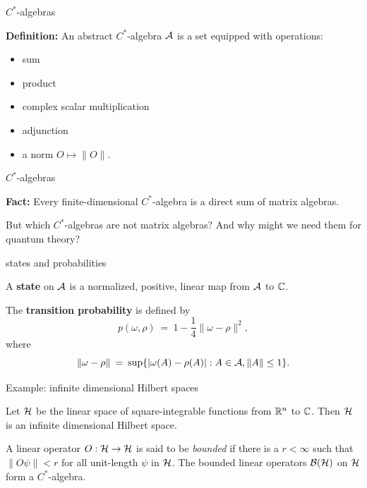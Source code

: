 \documentclass[8pt]{beamer}
\begin{document}
\begin{frame}{$C^*$-algebras}

  \textbf{Definition:} An abstract $C^*$-algebra $\mathcal A$ is a set
  equipped with operations:
\begin{itemize}
\item sum
\item product
\item complex scalar multiplication
\item adjunction
\item a norm $O\mapsto \| O\|$.
\end{itemize}


\end{frame}
\begin{frame}{$C^*$-algebras}

  \textbf{Fact:} Every finite-dimensional $C^*$-algebra is a direct
  sum of matrix algebras.

  But which $C^*$-algebras are not matrix algebras?  And why might we
  need them for quantum theory?

\end{frame}



\begin{frame}{states and probabilities}

  A \textbf{state} on $\mathcal A$ is a normalized, positive, linear map from
  $\mathcal A$ to $\mathbb C$.

\bigskip The \textbf{transition probability} is defined by
$$ p(\omega ,\rho ) \: =\: 1-\frac{1}{4}\| \omega -\rho \| ^2 ,$$
where 
$$ \| \omega - \rho \| \: = \: \mathrm{sup}\{ |\omega (A)-\rho (A)| : A\in \mathcal A, \| A\|\leq 1 \} .$$


\end{frame}

\begin{frame}{Example: infinite dimensional Hilbert spaces}

  Let $\mathcal H$ be the linear space of square-integrable functions from
  $\mathbb R ^n$ to $\mathbb C$.  Then $\mathcal H$ is an infinite dimensional Hilbert
  space.

  \bigskip A linear operator $O:\mathcal H\to\mathcal H$ is said to be
  \emph{bounded} if there is a $r<\infty$ such that $\| O\psi \|<r$
  for all unit-length $\psi$ in $\mathcal H$.  The bounded linear operators
  $\mathcal B (\mathcal H )$ on $\mathcal H$ form a $C^*$-algebra.


\end{frame}
\end{document}

